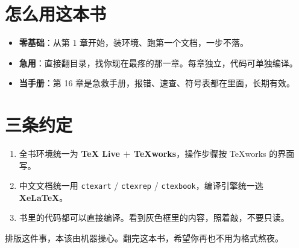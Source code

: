 \documentclass[UTF8, 12pt, a4paper, oneside]{ctexbook}
\begin{document}
\section*{怎么用这本书}

\begin{itemize}
  \item \textbf{零基础}：从第 1 章开始，装环境、跑第一个文档，一步不落。
  \item \textbf{急用}：直接翻目录，找你现在最疼的那一章。每章独立，代码可单独编译。
  \item \textbf{当手册}：第 16 章是急救手册，报错、速查、符号表都在里面，长期有效。
\end{itemize}

\section*{三条约定}

\begin{enumerate}
  \item 全书环境统一为 \textbf{TeX Live + TeXworks}，操作步骤按 TeXworks 的界面写。
  \item 中文文档统一用 \texttt{ctexart} / \texttt{ctexrep} / \texttt{ctexbook}，编译引擎统一选 \textbf{XeLaTeX}。
  \item 书里的代码都可以直接编译。看到灰色框里的内容，照着敲，不要只读。
\end{enumerate}

\vspace{1em}
\noindent 排版这件事，本该由机器操心。翻完这本书，希望你再也不用为格式熬夜。

\tableofcontents

\mainmatter
\pagestyle{fancy}

















\end{document}
